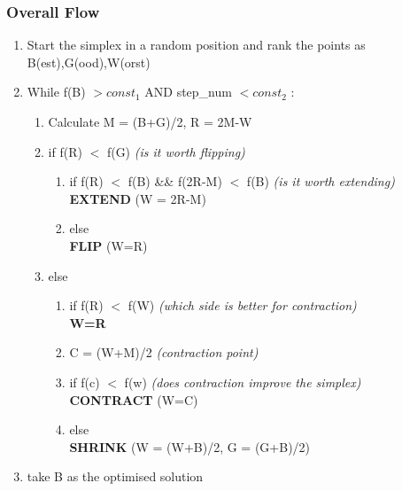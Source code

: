 \subsubsection{Overall Flow}
\begin{enumerate}[label=\Alph*.]
    \item Start the simplex in a random position and rank the points as B(est),G(ood),W(orst)
    \item While f(B) $> const_1$ AND step\_num $< const_2$ :
    \begin{enumerate}[label=\arabic*.]
        \item Calculate M = (B+G)/2, R = 2M-W
        \item if f(R) $<$ f(G) \emph{(is it worth flipping)}
            \begin{enumerate}
                \item if f(R) $<$ f(B) \&\& f(2R-M) $<$ f(B) \emph{(is it worth extending)}\\
                    \textbf{EXTEND} (W = 2R-M)
                \item else \\
                    \textbf{FLIP} (W=R)
            \end{enumerate}
        \item else
            \begin{enumerate}
                \item if f(R) $<$ f(W) \emph{(which side is better for contraction)}\\
                    \textbf{W=R}
                \item C = (W+M)/2 \emph{(contraction point)}
                \item if f(c) $<$ f(w) \emph{(does contraction improve the simplex)}\\
                    \textbf{CONTRACT} (W=C)
                \item else \\
                    \textbf{SHRINK} (W = (W+B)/2, G = (G+B)/2)
            \end{enumerate}        
    \end{enumerate}
    \item take B as the optimised solution
\end{enumerate}


